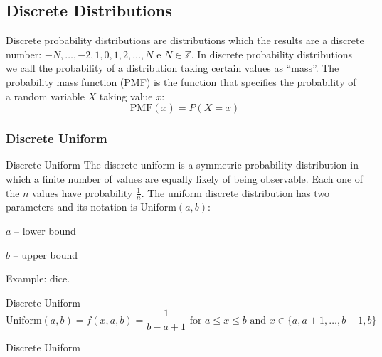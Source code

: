 \subsection{Discrete Distributions}
\begin{frame}
	\begin{defn}
		Discrete probability distributions are distributions which the
		results are a discrete number:
		$-N, \dots, -2, 1, 0,1,2,\dots, N$ e $N \in \mathbb{Z}$.
		In discrete probability distributions we call the probability
		of a distribution taking certain values as ``mass''.
		The probability mass function (PMF) is the function that
		specifies the probability of a random variable $X$ taking value $x$:
		$$\text{PMF}(x) = P(X = x)$$
	\end{defn}
\end{frame}

\subsubsection{Discrete Uniform}
\begin{frame}{Discrete Uniform}
	The discrete uniform is a symmetric probability distribution in which
	a finite number of values are equally likely of being observable.
	Each one of the $n$ values have probability $\frac{1}{n}$.
	\vfill
	The uniform discrete distribution has two parameters and its notation is
	$\text{Uniform}(a, b)$:
	\begin{vfilleditems}
		\item $a$ -- lower bound
		\item $b$ -- upper bound
	\end{vfilleditems}
	\vfill
	Example: dice.
\end{frame}

\begin{frame}{Discrete Uniform}
	$$\text{Uniform}(a,b) = f(x, a, b) = \frac{1}{b-a+1} \text{ for $a \leq x \leq b$ and $x\in \{a,a+1,\dots ,b-1,b\}$}$$
\end{frame}

\begin{frame}{Discrete Uniform}
	\centering
\end{frame}


